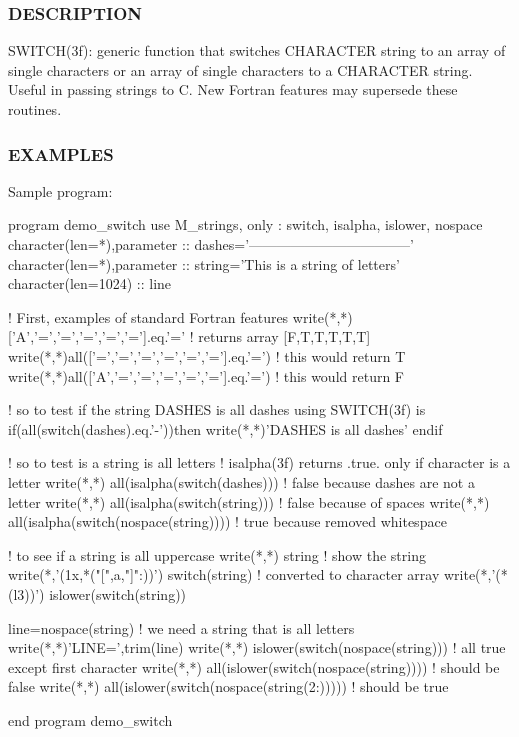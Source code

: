  \subsubsection*{D\+E\+S\+C\+R\+I\+P\+T\+I\+ON}

\begin{DoxyVerb}SWITCH(3f): generic function that switches CHARACTER string to an array
of single characters or an array of single characters to a CHARACTER
string. Useful in passing strings to C. New Fortran features may
supersede these routines.
\end{DoxyVerb}


\subsubsection*{E\+X\+A\+M\+P\+L\+ES}

Sample program\+: \begin{DoxyVerb}program demo_switch
use M_strings, only : switch, isalpha, islower, nospace
character(len=*),parameter :: dashes='-----------------------------------'
character(len=*),parameter :: string='This is a string of letters'
character(len=1024)        :: line

! First, examples of standard Fortran features
write(*,*)['A','=','=','=','=','='].eq.'='      ! returns array [F,T,T,T,T,T]
write(*,*)all(['=','=','=','=','=','='].eq.'=') ! this would return T
write(*,*)all(['A','=','=','=','=','='].eq.'=') ! this would return F

! so to test if the string DASHES is all dashes using SWITCH(3f) is
if(all(switch(dashes).eq.'-'))then
   write(*,*)'DASHES is all dashes'
endif

! so to test is a string is all letters
! isalpha(3f) returns .true. only if character is a letter
write(*,*) all(isalpha(switch(dashes)))  ! false because dashes are not a letter
write(*,*) all(isalpha(switch(string)))  ! false because of spaces
write(*,*) all(isalpha(switch(nospace(string))))  ! true because removed whitespace

! to see if a string is all uppercase
write(*,*) string                           ! show the string
write(*,'(1x,*("[",a,"]":))') switch(string)   ! converted to character array
write(*,'(*(l3))') islower(switch(string))

line=nospace(string)                        ! we need a string that is all letters
write(*,*)'LINE=',trim(line)
write(*,*) islower(switch(nospace(string))) ! all true except first character
write(*,*) all(islower(switch(nospace(string))))      ! should be false
write(*,*) all(islower(switch(nospace(string(2:)))))  ! should be true

end program demo_switch
\end{DoxyVerb}


